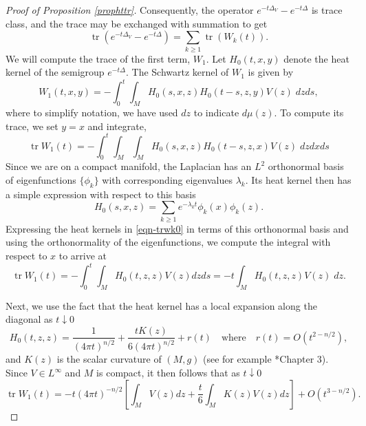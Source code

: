 \documentclass[letterpaper,12pt]{amsart}
\def \eref{\eqref}
\newcommand{\tr}{\mathop{\mathrm{tr}}}
\begin{document}
\begin{proof}[Proof of Proposition \ref{prophttr}]
Consequently, the operator $e^{-t\Delta_V} - e^{-t\Delta}$ is trace class, and the trace may be exchanged with summation to get
$$\tr(e^{-t\Delta_V} - e^{-t\Delta}) = \sum_{k \geq 1} \tr (W_k (t)).$$
We will compute the trace of the first term, $W_1$.  Let $H_0 (t,x,y)$ denote the heat kernel of the semigroup
$e^{-t\Delta}$. The Schwartz kernel of $W_1$ is given by
$$W_1 (t, x, y) = - \int_{0} ^t \int_M H_0 (s,x,z) H_0 (t-s, z, y) V(z) \;dz ds, $$
where to simplify notation, we have used $dz$ to indicate $d\mu(z)$. To compute its trace, we set $y=x$ and integrate,
\begin{equation} \label{eqn-trwk0}
\tr W_1 (t) = -\int_0 ^t \int_M \int_M H_0 (s,x,z) H_0 (t-s,z,x) V(z) \; dz dx ds
\end{equation}
Since we are on a compact manifold, the Laplacian has an $L^2$ orthonormal basis of eigenfunctions $\{ \phi_k\}$ with corresponding eigenvalues $\lambda_k$. Its heat kernel then has a simple expression with respect to this basis
\begin{equation} \label{H0_onb}
H_0 (s,x,z) = \sum_{k \geq 1} e^{-\lambda_k t} \phi_k (x) \phi_k (z).
\end{equation}
Expressing the heat kernels in \eref{eqn-trwk0} in terms of this orthonormal basis and using the orthonormality of the eigenfunctions, we compute the integral with respect to $x$ to arrive at
\begin{equation}  \label{W_1e1}
\tr W_1 (t) = - \int_0 ^t \int_M H_0(t, z, z) V(z) dz ds = -t \int_M H_0 (t,z,z) V(z) \;dz.
\end{equation}

Next, we use the fact that the heat kernel has a local expansion along the diagonal as $t\downarrow 0$
$$H_0(t,z,z) = \frac{1}{(4\pi t)^{n/2}} + \frac{t K(z)}{6(4\pi t)^{n/2}} + r(t) \quad \text{where}  \quad r(t) = O(t^{2-n/2}),$$
and $K(z)$ is the scalar curvature of $(M,g)$ (see for example \cite{Ro}*{Chapter 3}).
Since $V \in L^\infty$ and $M$ is compact, it then follows that as  $t \downarrow 0$
\begin{equation} \label{trw1}
\tr W_1 (t) = -t (4\pi t)^{-n/2} \left[ \int_M V(z) dz + \frac{t}{6} \int_M K(z) V(z) dz\right] +  O(t^{3-n/2}).
\end{equation}


\end{proof}
\end{document}
